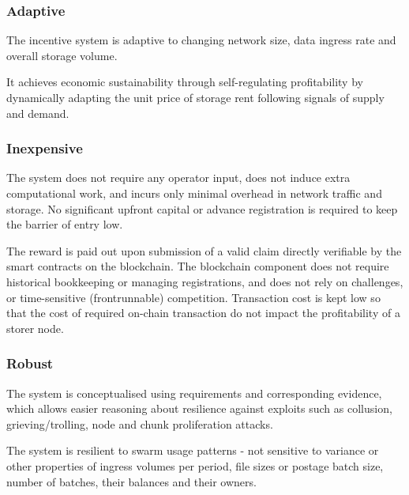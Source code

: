 \subsubsection{Adaptive}

The incentive system is adaptive to changing network size, data ingress rate and overall storage volume. 

It achieves economic sustainability through self-regulating profitability by dynamically adapting the unit price of storage rent following signals of supply and demand. 

\subsubsection{Inexpensive}

The system does not require any operator input, does not induce extra computational work, and incurs only minimal overhead in network traffic and storage. No significant upfront capital or advance registration is required to keep the barrier of entry low. 

The reward is paid out upon submission of a valid claim directly verifiable by the smart contracts on the blockchain. The blockchain component does not require historical bookkeeping or managing registrations, and does not rely on challenges, or time-sensitive (frontrunnable) competition. Transaction cost is kept low so that the cost of required on-chain transaction do not impact the profitability of a storer node.

\subsubsection{Robust}

The system is conceptualised using requirements and corresponding evidence, which allows easier reasoning about resilience against exploits such as collusion, grieving/trolling, node and chunk proliferation attacks. 

The system is resilient to swarm usage patterns - not sensitive to variance or other properties of ingress volumes per period, file sizes or postage batch size, number of  batches, their balances and their owners.

